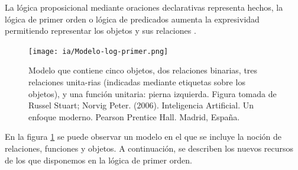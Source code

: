 \documentclass[11pt,fleqn]{book} %
\begin{document}
La lógica proposicional mediante oraciones declarativas representa hechos, la lógica de primer orden o lógica de predicados aumenta la expresividad permitiendo representar los objetos y sus relaciones \cite{guerra_repcon}.

\begin{figure}[ht]
\centering\texttt{[image: ia/Modelo-log-primer.png]}
\caption{Modelo que contiene cinco objetos, dos relaciones binarias, tres relaciones unita-rias (indicadas mediante etiquetas sobre los objetos), y una función unitaria: pierna izquierda. Figura tomada de Russel Stuart; Norvig Peter. (2006). Inteligencia Artificial. Un enfoque moderno. Pearson Prentice Hall. Madrid, España.\cite{russell2004inteligencia} }

\label{fig:Modelo-log-primer} 
\end{figure}

En la figura \ref{fig:Modelo-log-primer} se puede observar un modelo en el que se incluye la noción de relaciones, funciones y objetos. A continuación, se describen los nuevos recursos de los que disponemos en la lógica de primer orden.
\end{document}
